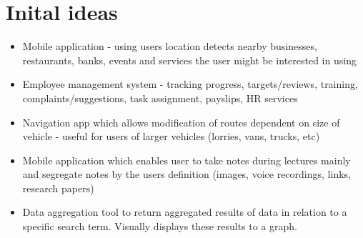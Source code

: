 \documentclass{report}
\begin{document}
\section{Inital ideas}
\begin{itemize}
	\item Mobile application - using users location detects nearby businesses, restaurants, banks, events and services the user might be interested in using
	\item Employee management system - tracking progress, targets/reviews, training, complaints/suggestions, task assignment, payslips, HR services
	\item Navigation app which allows modification of routes dependent on size of vehicle - useful for users of larger vehicles (lorries, vans, trucks, etc)
	\item Mobile application which enables user to take notes during lectures mainly and segregate notes by the users definition (images, voice recordings, links, research papers)
	\item Data aggregation tool to return aggregated results of data in relation to a specific search term. Visually displays these results to a graph.
\end{itemize}
\end{document}

